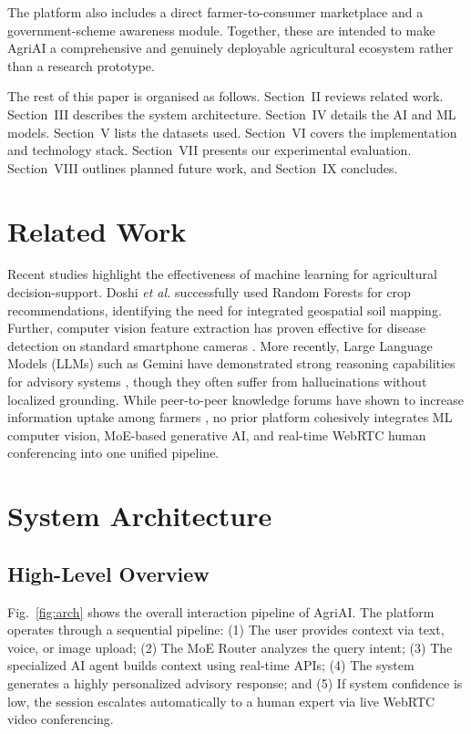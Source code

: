 \documentclass[conference]{IEEEtran}
\begin{document}
The platform also includes a direct farmer-to-consumer marketplace and a
government-scheme awareness module. Together, these are intended to make
AgriAI a comprehensive and genuinely deployable agricultural ecosystem rather
than a research prototype.

The rest of this paper is organised as follows. Section~II reviews related
work. Section~III describes the system architecture. Section~IV details the
AI and ML models. Section~V lists the datasets used. Section~VI covers the
implementation and technology stack. Section~VII presents our experimental
evaluation. Section~VIII outlines planned future work, and Section~IX
concludes.

\section{Related Work}
Recent studies highlight the effectiveness of machine learning for agricultural decision-support. Doshi \textit{et al.} \cite{doshi2018} successfully used Random Forests for crop recommendations, identifying the need for integrated geospatial soil mapping. Further, computer vision feature extraction has proven effective for disease detection on standard smartphone cameras \cite{mohanty2016}. More recently, Large Language Models (LLMs) such as Gemini have demonstrated strong reasoning capabilities for advisory systems \cite{google2024gemini}, though they often suffer from hallucinations without localized grounding. While peer-to-peer knowledge forums have shown to increase information uptake among farmers \cite{van2018}, no prior platform cohesively integrates ML computer vision, MoE-based generative AI, and real-time WebRTC human conferencing into one unified pipeline.
\section{System Architecture}

\subsection{High-Level Overview}

Fig.~\ref{fig:arch} shows the overall interaction pipeline of AgriAI. The platform operates through a sequential pipeline: (1) The user provides context via text, voice, or image upload; (2) The MoE Router analyzes the query intent; (3) The specialized AI agent builds context using real-time APIs; (4) The system generates a highly personalized advisory response; and (5) If system confidence is low, the session escalates automatically to a human expert via live WebRTC video conferencing.
\end{document}
